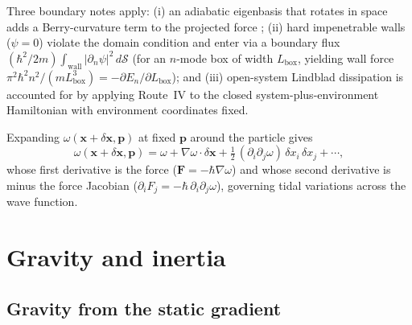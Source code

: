 \documentclass[aps,prd,onecolumn,tightenlines,nofootinbib,notitlepage,10pt,floatfix]{revtex4-2}
\theoremstyle{indentedtheorem}
\begin{document}
\noindent Three boundary notes apply: (i) an adiabatic eigenbasis that rotates in space adds a Berry-curvature term to the projected force \citep{Berry1984Quantal,Sundaram1999Wave}; (ii) hard impenetrable walls ($\psi=0$) violate the domain condition and enter via a boundary flux $(\hbar^2/2m)\int_{\text{wall}}|\partial_n\psi|^2\,d\mathcal{S}$ (for an $n$-mode box of width $L_\text{box}$, yielding wall force $\pi^2\hbar^2 n^2/(mL_\text{box}^3)=-\partial E_n/\partial L_\text{box}$); and (iii) open-system Lindblad dissipation \citep{Lindblad1976Generators} is accounted for by applying Route~IV to the closed system-plus-environment Hamiltonian with environment coordinates fixed.

Expanding $\omega(\mathbf{x}+\delta\mathbf{x},\mathbf{p})$ at fixed $\mathbf{p}$ around the particle gives
\begin{equation}
    \omega(\mathbf{x}+\delta\mathbf{x},\mathbf{p}) = \omega + \nabla\omega\cdot\delta\mathbf{x} + \tfrac{1}{2}\,(\partial_i\partial_j\omega)\,\delta x_i\,\delta x_j + \cdots ,
    \label{eq:omega_expansion}
\end{equation}
whose first derivative is the force ($\mathbf{F}=-\hbar\nabla\omega$) and whose second derivative is minus the force Jacobian ($\partial_i F_j=-\hbar\,\partial_i\partial_j\omega$), governing tidal variations across the wave function.

\section{Gravity and inertia}
\label{sec:grav_inertia}

\subsection{Gravity from the static gradient}
\label{sec:gravity}
\end{document}
